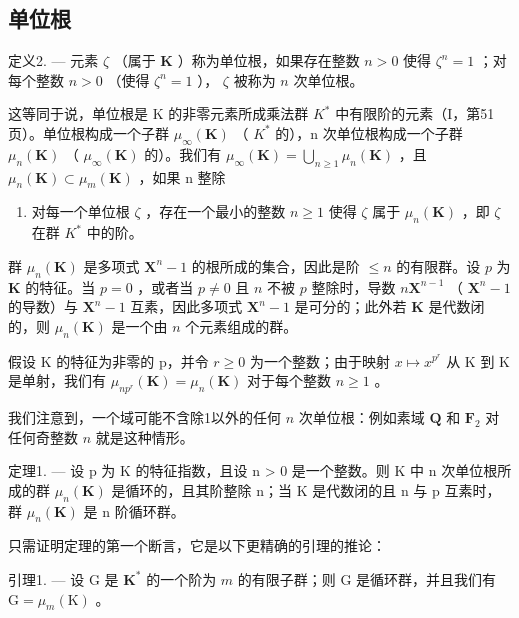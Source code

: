 \subsection{单位根}

定义2. --- 元素 \(\zeta\) （属于 \(\mathbf{K}\) ）称为单位根，如果存在整数 \(n > 0\) 使得 \(\zeta^n = 1\) ；对每个整数 \(n > 0\) （使得 \(\zeta^n = 1\) ）， \(\zeta\) 被称为 \(n\) 次单位根。

这等同于说，单位根是 K 的非零元素所成乘法群 \(K^{*}\) 中有限阶的元素（I，第51页）。单位根构成一个子群 \(\mu_{\infty}(\mathbf{K})\) （ \(K^{*}\) 的），n 次单位根构成一个子群 \(\mu_{n}(\mathbf{K})\) （ \(\mu_{\infty}(\mathbf{K})\) 的）。我们有 \(\mu_{\infty}(\mathbf{K}) = \bigcup_{n \geqslant 1} \mu_{n}(\mathbf{K})\) ，且 \(\mu_{n}(\mathbf{K}) \subset \mu_{m}(\mathbf{K})\) ，如果 n 整除

\begin{enumerate}
\def\labelenumi{\alph{enumi}.}
\setcounter{enumi}{12}
\tightlist
\item
  对每一个单位根 \(\zeta\) ，存在一个最小的整数 \(n \geqslant 1\) 使得 \(\zeta\) 属于 \(\mu_{n}(\mathbf{K})\) ，即 \(\zeta\) 在群 \(K^{*}\) 中的阶。
\end{enumerate}

群 \(\mu_n(\mathbf{K})\) 是多项式 \(\mathbf{X}^n - 1\) 的根所成的集合，因此是阶 \(\leqslant n\) 的有限群。设 \(p\) 为 \(\mathbf{K}\) 的特征。当 \(p = 0\) ，或者当 \(p \neq 0\) 且 \(n\) 不被 \(p\) 整除时，导数 \(n\mathbf{X}^{n-1}\) （ \(\mathbf{X}^n - 1\) 的导数）与 \(\mathbf{X}^n - 1\) 互素，因此多项式 \(\mathbf{X}^n - 1\) 是可分的；此外若 \(\mathbf{K}\) 是代数闭的，则 \(\mu_n(\mathbf{K})\) 是一个由 \(n\) 个元素组成的群。

假设 K 的特征为非零的 p，并令 \(r \geqslant 0\) 为一个整数；由于映射 \(x \mapsto x^{p^{r}}\) 从 K 到 K 是单射，我们有 \(\mu_{np^{r}}(\mathbf{K}) = \mu_n(\mathbf{K})\) 对于每个整数 \(n \geqslant 1\) 。

我们注意到，一个域可能不含除1以外的任何 \(n\) 次单位根：例如素域 \(\mathbf{Q}\) 和 \(\mathbf{F}_2\) 对任何奇整数 \(n\) 就是这种情形。

定理1. --- 设 p 为 K 的特征指数，且设 n \textgreater{} 0 是一个整数。则 K 中 n 次单位根所成的群 \(\mu_{n}(\mathbf{K})\) 是循环的，且其阶整除 n；当 K 是代数闭的且 n 与 p 互素时，群 \(\mu_{n}(\mathbf{K})\) 是 n 阶循环群。

只需证明定理的第一个断言，它是以下更精确的引理的推论：

引理1. --- 设 G 是 \(\mathbf{K}^*\) 的一个阶为 \(m\) 的有限子群；则 G 是循环群，并且我们有 \(\mathrm{G} = \mu_m(\mathrm{K})\) 。

